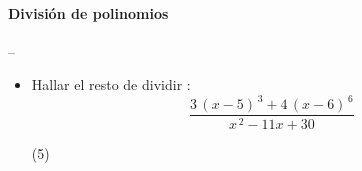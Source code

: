 \documentclass[10pt, twocolumn, landscape, a4paper]{article}
\begin{document}
\paragraph*{División de polinomios} -- \\

\begin{itemize}
\item{Hallar el resto de dividir :
$$
\dfrac{3\,(x - 5)^{\,3} + 4\,(x - 6)^{\,6}}{x^{\,2} - 11x + 30}
$$
\begin{tasks}(5)
\end{tasks}
}
\end{itemize}
\end{document}
